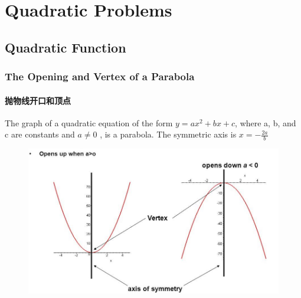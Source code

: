 \documentclass[
	11pt, %
	handout,
]{beamer}
\begin{document}

\section{Quadratic Problems}


\subsection{Quadratic Function}



\begin{frame}
	\frametitle{The Opening and Vertex of a Parabola}
	\framesubtitle{抛物线开口和顶点}
			\begin{definition}
		The graph of a quadratic equation of the form $y = ax^2 + bx +c $, where a, b, and c are constants and $a\neq 0$ , is a \alert{parabola}. The symmetric axis is  $x= -\frac{2a}{b}$
			\end{definition}

			\begin{figure}
				\includegraphics[width=0.6\linewidth]{Parabola.jpeg}
			\end{figure}

\end{frame}

\end{document}
